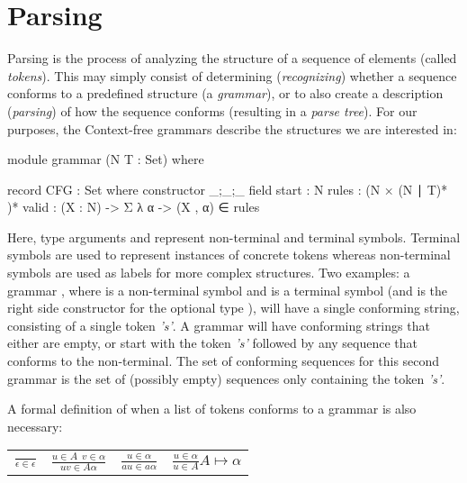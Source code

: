\chapter{Parsing} \label{Parsing}

	Parsing is the process of analyzing the structure of a sequence of elements
	(called \emph{tokens}). This may simply consist of determining
	(\emph{recognizing}) whether a sequence conforms to a predefined structure
	(a \emph{grammar}), or to also create a description (\emph{parsing}) of how
	the sequence conforms (resulting in a \emph{parse tree}). For our
	purposes, the Context-free grammars describe the structures we are
	interested in:

	\begin{code}
		module grammar (N T : Set) where

		record CFG : Set where
		  constructor _;_;_
		  field
		    start : N
		    rules : (N × (N ∣ T)* )*
    		valid : (X : N) -> Σ λ α -> (X , α) ∈ rules
	\end{code}

	Here, type arguments  and  represent non-terminal and
	terminal symbols. Terminal symbols are used to represent instances of
	concrete tokens whereas non-terminal symbols are used as labels for more
	complex structures. Two examples: a grammar , where  is a non-terminal symbol and  is a
	terminal symbol (and  is the right side constructor for the
	optional type \codett{|}), will have a single conforming string, consisting
	of a single token \emph{'s'}. A grammar  will have conforming strings that either are empty, or
	start with the token \emph{'s'} followed by any sequence that conforms to
	the  non-terminal. The set of conforming sequences for this second
	grammar is the set of (possibly empty) sequences only containing the token
	\emph{'s'}.

	A formal definition of when a list of tokens conforms to a grammar is also
	necessary:

	\begin{table}[h]
	\centering
	\begin{tabular}{cccc}
			 \( \displaystyle \frac{\ }{\epsilon\in\epsilon} \) &
			 \( \displaystyle \frac{u\in A\ \ v\in\alpha}{uv\in A\alpha} \) &
			 \( \displaystyle \frac{u\in\alpha}{au\in a\alpha} \) &
			 \( \displaystyle \frac{u\in\alpha}{u\in A}A \mapsto \alpha \)
	\end{tabular}
	\end{table}

